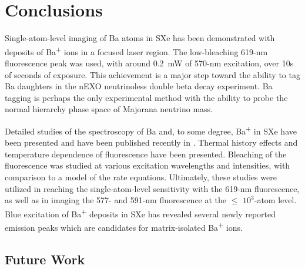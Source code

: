 \chapter{Conclusions}

Single-atom-level imaging of Ba atoms in SXe has been demonstrated with deposits of Ba\textsuperscript{+} ions in a focused laser region.  The low-bleaching 619-nm fluorescence peak was used, with around 0.2~mW of 570-nm excitation, over 10s of seconds of exposure.  This achievement is a major step toward the ability to tag Ba daughters in the nEXO neutrinoless double beta decay experiment.  Ba tagging is perhaps the only experimental method with the ability to probe the normal hierarchy phase space of Majorana neutrino mass.

Detailed studies of the spectroscopy of Ba and, to some degree, Ba\textsuperscript{+} in SXe have been presented and have been published recently in \cite{Mong2015}.  Thermal history effects and temperature dependence of fluorescence have been presented.  Bleaching of the fluorescence was studied at various excitation wavelengths and intensities, with comparison to a model of the rate equations.  Ultimately, these studies were utilized in reaching the single-atom-level sensitivity with the 619-nm fluorescence, as well as in imaging the 577- and 591-nm fluorescence at the $\leq$ $10^{3}$-atom level.  Blue excitation of Ba\textsuperscript{+} deposits in SXe has revealed several newly reported emission peaks which are candidates for matrix-isolated Ba\textsuperscript{+} ions.



\section{Future Work}
\label{sec:future}

